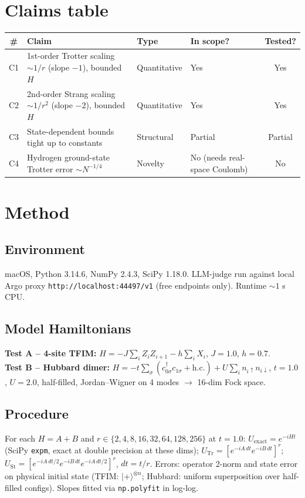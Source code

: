 \documentclass[11pt]{article}
\begin{document}
\section{Claims table}
\begin{center}
\begin{tabular}{clllc}
\toprule
\# & Claim & Type & In scope? & Tested? \\
\midrule
C1 & 1st-order Trotter scaling $\sim 1/r$ (slope $-1$), bounded $H$ & Quantitative & Yes & Yes \\
C2 & 2nd-order Strang scaling $\sim 1/r^2$ (slope $-2$), bounded $H$ & Quantitative & Yes & Yes \\
C3 & State-dependent bounds tight up to constants & Structural & Partial & Partial \\
C4 & Hydrogen ground-state Trotter error $\sim N^{-1/4}$ & Novelty & No (needs real-space Coulomb) & No \\
\bottomrule
\end{tabular}
\end{center}

\section{Method}
\subsection{Environment} macOS, Python 3.14.6, NumPy 2.4.3, SciPy 1.18.0. LLM-judge run against
local Argo proxy \texttt{http://localhost:44497/v1} (free endpoints only). Runtime $\sim 1$ s CPU.

\subsection{Model Hamiltonians}
\textbf{Test A -- 4-site TFIM:} $H = -J\sum_i Z_iZ_{i+1} - h\sum_i X_i$, $J=1.0$, $h=0.7$. \\
\textbf{Test B -- Hubbard dimer:} $H = -t\sum_\sigma (c^\dagger_{0\sigma}c_{1\sigma} + \mathrm{h.c.}) + U\sum_i n_{i\uparrow}n_{i\downarrow}$,
$t=1.0$, $U=2.0$, half-filled, Jordan--Wigner on 4 modes $\to$ 16-dim Fock space.

\subsection{Procedure}
For each $H = A+B$ and $r \in \{2,4,8,16,32,64,128,256\}$ at $t=1.0$:
$U_{\mathrm{exact}} = e^{-iHt}$ (SciPy \texttt{expm}, exact at double precision at these dims);
$U_{\mathrm{Tr}} = [e^{-iA\,dt}e^{-iB\,dt}]^r$; $U_{\mathrm{St}} = [e^{-iA\,dt/2}e^{-iB\,dt}e^{-iA\,dt/2}]^r$, $dt = t/r$.
Errors: operator 2-norm and state error on physical initial state (TFIM: $|+\rangle^{\otimes n}$;
Hubbard: uniform superposition over half-filled configs). Slopes fitted via \texttt{np.polyfit} in log-log.
\end{document}

